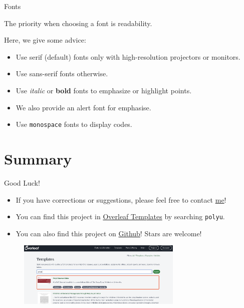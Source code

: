 \documentclass[10pt,aspectratio=169]{beamer}
\begin{document}
\begin{frame}{Fonts}
	
	The priority when choosing a font is readability.
	
	Here, we give some advice:
	\begin{itemize}
		\item Use serif (default) fonts only with high-resolution projectors or monitors.
		\item Use \textsf{sans-serif} fonts otherwise.
		\item Use \textit{italic} or \textbf{bold} fonts to emphasize or highlight points.
		\item We also provide an \alert{alert} font for emphasise.
		\item Use \texttt{monospace} fonts to display codes.
	\end{itemize}

\end{frame}

\section{Summary}

\begin{frame}{Good Luck!}
	\begin{itemize}
		\item If you have corrections or suggestions, please feel free to contact \href{mailto:ruisong20@gmail.com}{me}!
		\item You can find this project in \href{https://www.overleaf.com/latex/templates}{Overleaf Templates} by searching \texttt{polyu}.
        \item You can also find this project on \href{https://github.com/wurahara/PolyU-Beamer-Slides}{Github}! Stars are welcome!
	\end{itemize}
	
	\begin{figure}[hbt]
		\includegraphics[width=0.7\textwidth]{source/ads.png}
	\end{figure}

\end{frame}

\backmatter %
\end{document}
